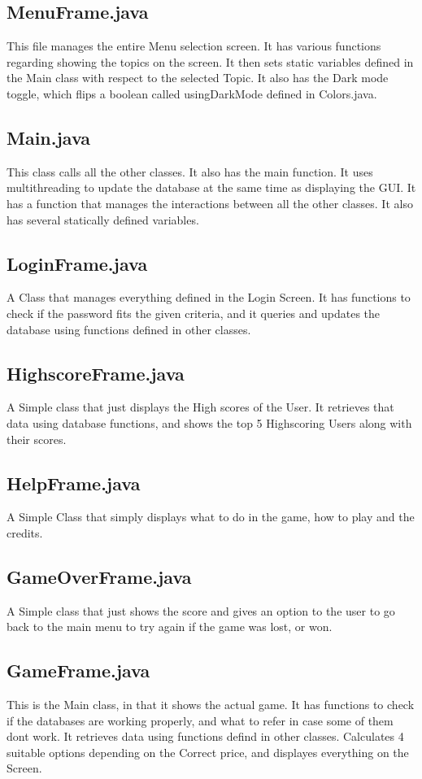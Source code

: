 \documentclass[11pt]{article}
\begin{document}
\subsection{MenuFrame.java}
This file manages the entire Menu selection screen. It has various functions regarding showing the topics on the screen. It then sets static variables defined in the Main class with respect to the selected Topic.
It also has the Dark mode toggle, which flips a boolean called usingDarkMode defined in Colors.java. 

\subsection{Main.java}
This class calls all the other classes. It also has the main function. It uses multithreading to update the database at the same time as displaying the GUI. It has a function that manages the interactions between all the other classes. It also has several statically defined variables. 

\subsection{LoginFrame.java}
A Class that manages everything defined in the Login Screen. It has functions to check if the password fits the given criteria, and it queries and updates the database using functions defined in other classes.

\subsection{HighscoreFrame.java}
A Simple class that just displays the High scores of the User. It retrieves that data using database functions, and shows the top 5 Highscoring Users along with their scores. 
\subsection{HelpFrame.java}
A Simple Class that simply displays what to do in the game, how to play and the credits. 

\subsection{GameOverFrame.java}
A Simple class that just shows the score and gives an option to the user to go back to the main menu to try again if the game was lost, or won. 
\subsection{GameFrame.java}
This is the Main class, in that it shows the actual game. It has functions to check if the databases are working properly, and what to refer in case some of them dont work. It retrieves data using functions defind in other classes. Calculates 4 suitable options depending on the Correct price, and displayes everything on the Screen. 
\end{document}
